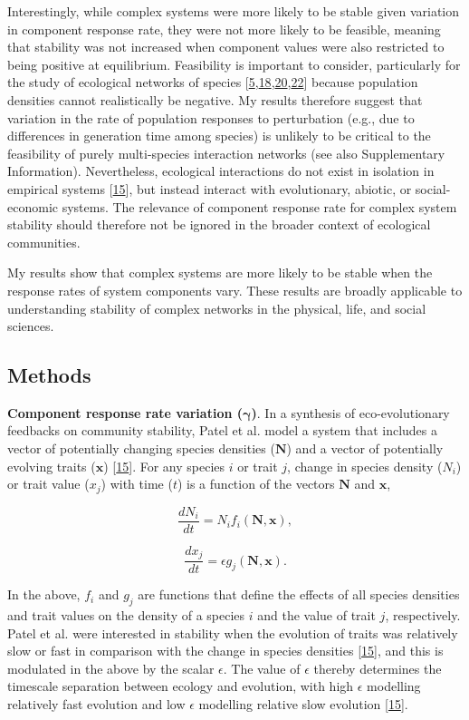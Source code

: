 \documentclass[]{article}
\begin{document}
Interestingly, while complex systems were more likely to be stable given
variation in component response rate, they were not more likely to be
feasible, meaning that stability was not increased when component values
were also restricted to being positive at equilibrium. Feasibility is
important to consider, particularly for the study of ecological networks
of species
{[}\protect\hyperlink{ref-Grilli2017}{5},\protect\hyperlink{ref-Stone2017}{18},\protect\hyperlink{ref-Dougoud2018}{20},\protect\hyperlink{ref-Servan2018}{22}{]}
because population densities cannot realistically be negative. My
results therefore suggest that variation in the rate of population
responses to perturbation (e.g., due to differences in generation time
among species) is unlikely to be critical to the feasibility of purely
multi-species interaction networks (see also Supplementary Information).
Nevertheless, ecological interactions do not exist in isolation in
empirical systems {[}\protect\hyperlink{ref-Patel2018}{15}{]}, but
instead interact with evolutionary, abiotic, or social-economic systems.
The relevance of component response rate for complex system stability
should therefore not be ignored in the broader context of ecological
communities.

My results show that complex systems are more likely to be stable when
the response rates of system components vary. These results are broadly
applicable to understanding stability of complex networks in the
physical, life, and social sciences.

\subsection{Methods}\label{methods}

\textbf{Component response rate variation (\(\mathbf{\gamma}\))}. In a
synthesis of eco-evolutionary feedbacks on community stability, Patel et
al. model a system that includes a vector of potentially changing
species densities (\(\mathbf{N}\)) and a vector of potentially evolving
traits (\(\mathbf{x}\)) {[}\protect\hyperlink{ref-Patel2018}{15}{]}. For
any species \(i\) or trait \(j\), change in species density (\(N_{i}\))
or trait value (\(x_{j}\)) with time (\(t\)) is a function of the
vectors \(\mathbf{N}\) and \(\mathbf{x}\),

\[\frac{dN_{i}}{dt} = N_{i}f_{i}(\mathbf{N}, \mathbf{x}),\]

\[\frac{dx_{j}}{dt} = \epsilon g_{j}(\mathbf{N}, \mathbf{x}).\]

In the above, \(f_{i}\) and \(g_{j}\) are functions that define the
effects of all species densities and trait values on the density of a
species \(i\) and the value of trait \(j\), respectively. Patel et al.
were interested in stability when the evolution of traits was relatively
slow or fast in comparison with the change in species densities
{[}\protect\hyperlink{ref-Patel2018}{15}{]}, and this is modulated in
the above by the scalar \(\epsilon\). The value of \(\epsilon\) thereby
determines the timescale separation between ecology and evolution, with
high \(\epsilon\) modelling relatively fast evolution and low
\(\epsilon\) modelling relative slow evolution
{[}\protect\hyperlink{ref-Patel2018}{15}{]}.
\end{document}
